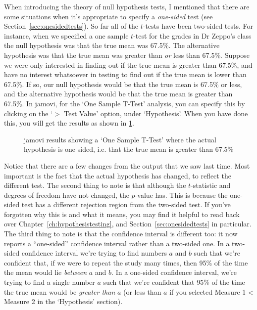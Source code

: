 When introducing the theory of null hypothesis tests, I mentioned that there are some situations when it's appropriate to specify a {\it one-sided} test (see Section~\ref{sec:onesidedtests}). So far all of the $t$-tests have been two-sided tests. For instance, when we specified a one sample $t$-test for the grades in Dr Zeppo's class the null hypothesis was that the true mean was 67.5\%. The alternative hypothesis was that the true mean was greater than {\it or} less than 67.5\%. Suppose we were only interested in finding out if the true mean is greater than 67.5\%, and have no interest whatsoever in testing to find out if the true mean is lower than 67.5\%. If so, our null hypothesis would be that the true mean is 67.5\% or less, and the alternative hypothesis would be that the true mean is greater than 67.5\%. In jamovi, for the `One Sample T-Test' analysis, you can specify this by clicking on the `$>$ Test Value' option, under `Hypothesis'. When you have done this, you will get the results as shown in \ref{fig:ttest_onesided1}.

\begin{figure}[htb]
\begin{center}
\caption{jamovi results showing a `One Sample T-Test' where the actual hypothesis is one sided, i.e. that the true mean is greater than 67.5\%}
\label{fig:ttest_onesided1}
\HR
\end{center}
\end{figure}

Notice that there are a few changes from the output that we saw last time. Most important is the fact that the actual hypothesis has changed, to reflect the different test. The second thing to note is that although the $t$-statistic and degrees of freedom have not changed, the $p$-value has. This is because the one-sided test has a different rejection region from the two-sided test. If you've forgotten why this is and what it means, you may find it helpful to read back over Chapter~\ref{ch:hypothesistesting}, and Section~\ref{sec:onesidedtests} in particular. The third thing to note is that the confidence interval is different too: it now reports a ``one-sided'' confidence interval rather than a two-sided one. In a two-sided confidence interval we're trying to find numbers $a$ and $b$ such that we're confident that, if we were to repeat the study many times, then 95\% of the time the mean would lie {\it between} $a$ and $b$. In a one-sided confidence interval, we're trying to find a single number $a$ such that we're confident that 95\% of the time the true mean would be {\it greater than} $a$ (or less than $a$ if you selected Measure 1 < Measure 2 in the `Hypothesis' section).

